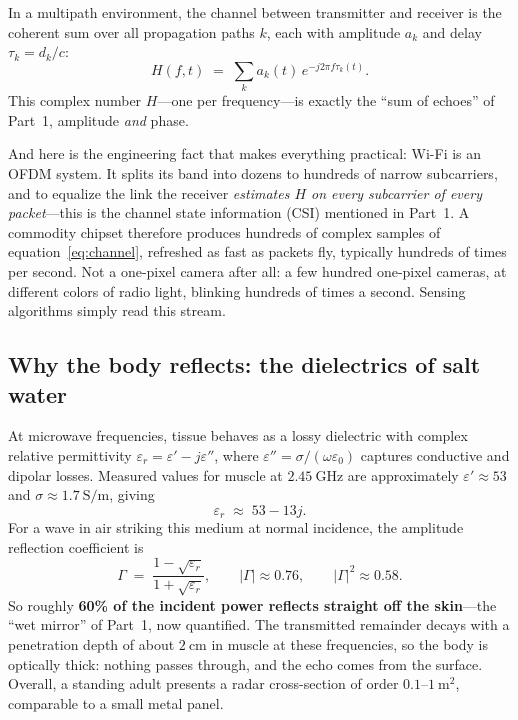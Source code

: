 \documentclass[11pt, letterpaper]{article}
\begin{document}
In a multipath environment, the channel between transmitter and receiver is the coherent sum over all propagation paths $k$, each with amplitude $a_k$ and delay $\tau_k = d_k/c$:
\begin{equation}
  H(f, t) \;=\; \sum_k a_k(t)\, e^{-j 2\pi f \tau_k(t)} .
  \label{eq:channel}
\end{equation}
This complex number $H$---one per frequency---is exactly the ``sum of echoes'' of Part~1, amplitude \textit{and} phase.

And here is the engineering fact that makes everything practical: Wi-Fi is an OFDM system. It splits its band into dozens to hundreds of narrow subcarriers, and to equalize the link the receiver \textit{estimates $H$ on every subcarrier of every packet}---this is the channel state information (CSI) mentioned in Part~1. A commodity chipset therefore produces hundreds of complex samples of equation~\eqref{eq:channel}, refreshed as fast as packets fly, typically hundreds of times per second. Not a one-pixel camera after all: a few hundred one-pixel cameras, at different colors of radio light, blinking hundreds of times a second. Sensing algorithms simply read this stream.

\subsection{Why the body reflects: the dielectrics of salt water}

At microwave frequencies, tissue behaves as a lossy dielectric with complex relative permittivity $\varepsilon_r = \varepsilon' - j\varepsilon''$, where $\varepsilon'' = \sigma/(\omega \varepsilon_0)$ captures conductive and dipolar losses. Measured values for muscle at $2.45\ \text{GHz}$ are approximately $\varepsilon' \approx 53$ and $\sigma \approx 1.7\ \text{S/m}$, giving
\begin{equation}
  \varepsilon_r \;\approx\; 53 - 13j .
\end{equation}
For a wave in air striking this medium at normal incidence, the amplitude reflection coefficient is
\begin{equation}
  \Gamma \;=\; \frac{1 - \sqrt{\varepsilon_r}}{1 + \sqrt{\varepsilon_r}}, \qquad
  |\Gamma| \approx 0.76, \qquad |\Gamma|^2 \approx 0.58 .
\end{equation}
So roughly \textbf{60\% of the incident power reflects straight off the skin}---the ``wet mirror'' of Part~1, now quantified. The transmitted remainder decays with a penetration depth of about $2\ \text{cm}$ in muscle at these frequencies, so the body is optically thick: nothing passes through, and the echo comes from the surface. Overall, a standing adult presents a radar cross-section of order $0.1$--$1\ \text{m}^2$, comparable to a small metal panel.
\end{document}
